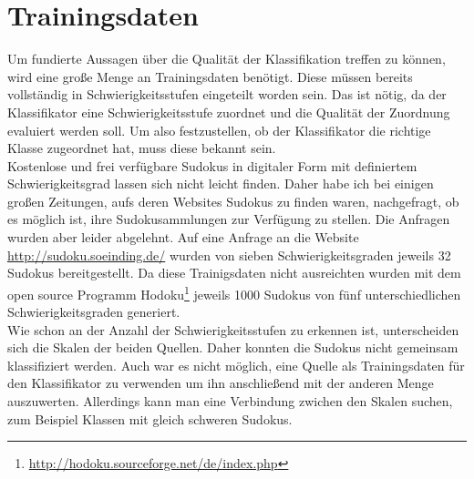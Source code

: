 \section{Trainingsdaten}
\label{Trainingsdaten}
Um fundierte Aussagen über die Qualität der Klassifikation treffen zu können, wird eine große Menge an Trainingsdaten benötigt. Diese müssen bereits vollständig in Schwierigkeitsstufen eingeteilt worden sein. Das ist nötig, da der Klassifikator eine Schwierigkeitsstufe zuordnet und die Qualität der Zuordnung evaluiert werden soll. Um also festzustellen, ob der Klassifikator die richtige Klasse zugeordnet hat, muss diese bekannt sein.\\
Kostenlose und frei verfügbare Sudokus in digitaler Form mit definiertem Schwierigkeitsgrad lassen sich nicht leicht finden. Daher habe ich bei einigen großen Zeitungen, aufs deren Websites Sudokus zu finden waren, nachgefragt, ob es möglich ist, ihre Sudokusammlungen zur Verfügung zu stellen. Die Anfragen wurden aber leider abgelehnt. Auf eine Anfrage an die Website \url{http://sudoku.soeinding.de/} wurden von sieben Schwierigkeitsgraden jeweils 32 Sudokus bereitgestellt. Da diese Trainigsdaten nicht ausreichten wurden mit dem open source Programm Hodoku\footnote{\url{http://hodoku.sourceforge.net/de/index.php}} jeweils 1000 Sudokus von fünf unterschiedlichen Schwierigkeitsgraden generiert.\\
Wie schon an der Anzahl der Schwierigkeitsstufen zu erkennen ist, unterscheiden sich die Skalen der beiden Quellen. Daher konnten die Sudokus nicht gemeinsam klassifiziert werden. Auch war es nicht möglich, eine Quelle als Trainingsdaten für den Klassifikator zu verwenden um ihn anschließend mit der anderen Menge auszuwerten. Allerdings kann man eine Verbindung zwichen den Skalen suchen, zum Beispiel Klassen mit gleich schweren Sudokus.\\